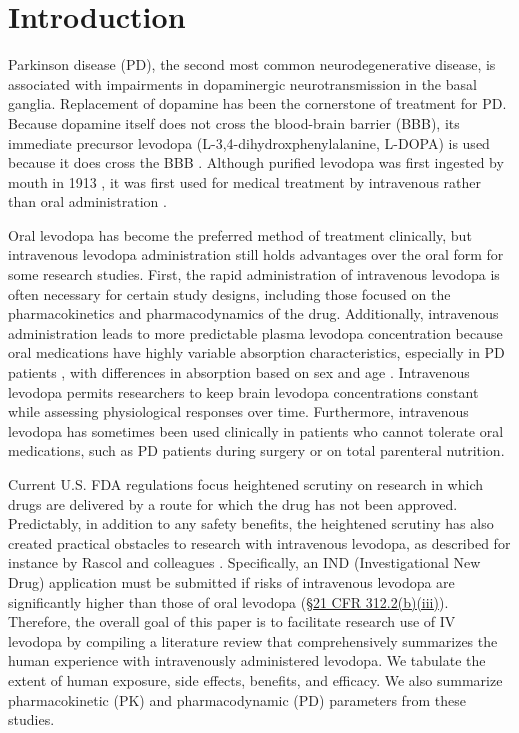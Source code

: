 \section{Introduction}
Parkinson disease (PD), the second most common neurodegenerative disease, is associated with impairments in dopaminergic neurotransmission in the basal ganglia. Replacement of dopamine has been the cornerstone of treatment for PD. Because dopamine itself does not cross the blood-brain barrier (BBB), its immediate precursor levodopa (L-3,4-dihydroxphenylalanine, L-DOPA) is used because it does cross the BBB \cite{11763859,13954967,5334614}. Although purified levodopa was first ingested by mouth in 1913 \cite{Roe_1997}, it was first used for medical treatment by intravenous rather than oral administration \cite{14430381,11763859}.
	
Oral levodopa has become the preferred method of treatment clinically, but intravenous levodopa administration still holds advantages over the oral form for some research studies.  First, the rapid administration of intravenous levodopa is often necessary for certain study designs, including those focused on the pharmacokinetics and pharmacodynamics of the drug.  Additionally, intravenous administration leads to more predictable plasma levodopa concentration because oral medications have highly variable absorption characteristics, especially in PD patients \cite{2797454}, with differences in absorption based on sex and age \cite{2775615,12011296}.  Intravenous levodopa permits researchers to keep brain levodopa concentrations constant while assessing physiological responses over time.  Furthermore, intravenous levodopa has sometimes been used clinically in patients who cannot tolerate oral medications, such as PD patients during surgery or on total parenteral nutrition.  

Current U.S. FDA regulations focus heightened scrutiny on research in which drugs are delivered by a route for which the drug has not been approved. Predictably, in addition to any safety benefits, the heightened scrutiny has also created practical obstacles to research with intravenous levodopa, as described for instance by Rascol and colleagues \citep[, p.~250]{11176963}.  Specifically, an IND (Investigational New Drug) application must be submitted if risks of intravenous levodopa are significantly higher than those of oral levodopa (\href{http://www.accessdata.fda.gov/scripts/cdrh/cfdocs/cfcfr/CFRSearch.cfm?fr=312.2}{\S 21 CFR 312.2(b)(iii)}).  Therefore, the overall goal of this paper is to facilitate research use of IV levodopa by compiling a literature review that comprehensively summarizes the human experience with intravenously administered levodopa.  We tabulate the extent of human exposure, side effects, benefits, and efficacy.  We also summarize pharmacokinetic (PK) and pharmacodynamic (PD) parameters from these studies. 
